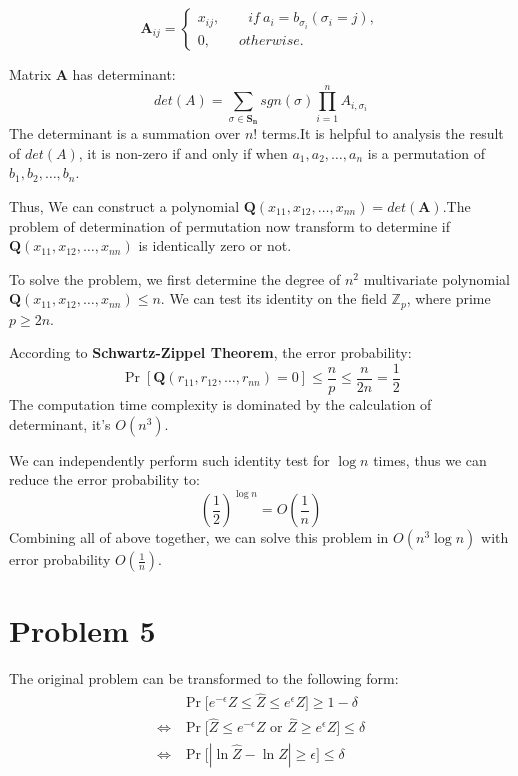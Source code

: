 \documentclass[a4paper, 12pt, titlepage]{article}
\begin{document}
\[
    \mathbf{A}_{ij} = \begin{cases}
                x_{ij}, \qquad if\ a_{i} = b_{\sigma_{i}} \left( \sigma_{i} = j \right),\\
                0, \qquad otherwise.
             \end{cases}
\]

Matrix \textbf{A} has determinant: 
\[
    det(A) = \sum_{\sigma \in \mathbf{S_{n}}} sgn(\sigma) \prod_{i = 1}^{n} A_{i, \sigma_{i}}
\]
The determinant is a summation over $n!$ terms.It is helpful to analysis the result of $det(A)$, 
it is non-zero if and only if when $a_{1}, a_{2}, \ldots, a_{n}$ is a permutation of $b_{1}, b_{2}, \ldots, b_{n}$. 

Thus, We can construct a polynomial $\mathbf{Q}(x_{11}, x_{12}, \ldots, x_{nn}) = det(\mathbf{A})$.The problem of determination of
permutation now transform to determine if $\mathbf{Q}(x_{11}, x_{12}, \ldots, x_{nn})$ is identically zero or not.

To solve the problem, we first determine the degree of $n^2$ multivariate polynomial $\mathbf{Q}(x_{11}, x_{12}, \ldots, x_{nn}) \leq n$.
We can test its identity on the field $\mathbb{Z}_{p}$, where prime $p \geq 2n$.

According to \textbf{Schwartz-Zippel Theorem}, the error probability:
\[
    \Pr \left[ \mathbf{Q}(r_{11}, r_{12}, \ldots, r_{nn}) = 0 \right] \leq \frac{n}{p} \leq \frac{n}{2n} = \frac{1}{2}
\]             
The computation time complexity is dominated by the calculation of determinant, it's $O\left( n^{3} \right)$.

We can independently perform such identity test for $\log{n}$ times, thus we can reduce the error probability to:
\[
    \left( \frac{1}{2} \right)^{\log{n}} = O \left( \frac{1}{n} \right)
\]
Combining all of above together, we can solve this problem in $O \left( n^{3} \log{n} \right)$ with error probability $O \left( \frac{1}{n} \right)$.

\section{Problem 5}
The original problem can be transformed to the following form: 
\begin{equation}
    \begin{aligned}
        &\Pr \bigg[ e^{-\epsilon} Z \leq \hat{Z} \leq e^{\epsilon} Z \bigg] \geq 1 - \delta \\
        \Longleftrightarrow &\Pr \bigg[ \hat{Z} \leq e^{-\epsilon} Z \text{\ or \ }  \hat{Z} \geq e^{\epsilon} Z \bigg] \leq \delta \\
        \Longleftrightarrow &\Pr \bigg[ |\ln{\hat{Z}} - \ln{Z}| \geq \epsilon \bigg] \leq \delta \\
    \end{aligned}
\end{equation}
\end{document}
